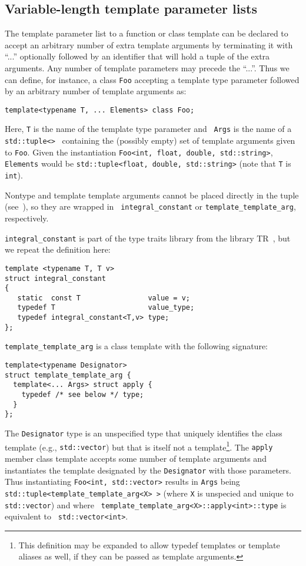 \documentclass{article}
\begin{document}
\subsection{Variable-length template parameter lists}
\par The template parameter list to a function or class template can
be declared to accept an arbitrary number of extra template arguments
by terminating it with ``...'' optionally followed by an identifier
that will hold a tuple of the extra arguments. Any number of template
parameters may precede the ``...''. Thus we can define, for instance,
a class {\tt Foo} accepting a template type parameter followed by an
arbitrary number of template arguments as:
\begin{verbatim}
template<typename T, ... Elements> class Foo;
\end{verbatim}

Here, {\tt T} is the name of the template type parameter and {\tt
  Args} is the name of a {\tt std::tuple<>}~\cite{Jarvi02} containing
the (possibly empty) set of template arguments given to {\tt Foo}.
Given the instantiation {\tt Foo<int, float, double, std::string>},
{\tt Elements} would be {\tt std::tuple<float, double, std::string>}
(note that {\tt T} is {\tt int}). 

Nontype and template template arguments cannot be placed directly in
the tuple (see~\cite{Jarvi02}), so they are wrapped in {\tt
  integral\_constant} or {\tt template\_template\_arg}, respectively. 

{\tt integral\_constant} is part of the type traits library from the
library TR~\cite{Maddock03}, but we repeat the definition here:
\begin{verbatim}
template <typename T, T v> 
struct integral_constant
{
   static  const T                value = v;
   typedef T                      value_type;
   typedef integral_constant<T,v> type;
};
\end{verbatim}

{\tt template\_template\_arg} is a class template with the following
signature: 
\begin{verbatim}
template<typename Designator>
struct template_template_arg {
  template<... Args> struct apply {
    typedef /* see below */ type;
  }
};
\end{verbatim}

The {\tt Designator} type is an unspecified type that uniquely
identifies the class template (e.g., {\tt std::vector}) but that is
itself not a template\footnote{This definition may be expanded to
  allow typedef templates or template aliases as well, if they can be
  passed as template arguments.}. The {\tt apply} member class
template accepts some number of template arguments and instantiates
the template designated by the {\tt Designator} with those parameters.
Thus instantiating {\tt Foo<int, std::vector>} results in {\tt Args}
being {\tt std::tuple<template\_template\_arg<X> >} (where {\tt X} is
unspecied and unique to {\tt std::vector}) and where {\tt
  template\_template\_arg<X>::apply<int>::type} is equivalent to {\tt
  std::vector<int>}.
\end{document}
